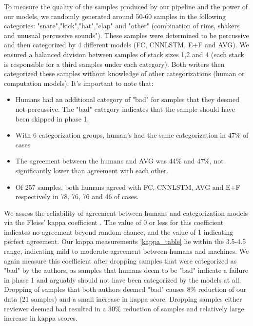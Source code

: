\documentclass{nime-alternate} %
\begin{document}
To measure the quality of the samples produced by our pipeline and the power of our models, we randomly generated around 50-60 samples in the following categories: "snare","kick","hat","clap" and "other" (combination of rims, 
shakers and unusual percussive sounds"). These samples were determined to be percussive and then categorized by 4 different models (FC, CNNLSTM, E+F and AVG). We ensured a balanced division between samples of stack sizes 1,2 and 4 (each stack is responsible for a third samples under each category). Both writers then categorized these samples without knowledge of other categorizations (human or computation models). It's important to note that:
\begin{itemize}
    \item Humans had an additional category of "bad" for samples that they deemed not percussive. The "bad" category indicates that the sample should have been skipped in phase 1. 
    \item With 6 categorization groups, human's had the same categorization in 47\% of cases
    \item The agreement between the humans and AVG was 44\% and 47\%, not significantly lower than agreement with each other. 
    \item Of 257 samples, both humans agreed with FC, CNNLSTM, AVG and E+F respectively in 78, 76, 76 and 46 of cases.
\end{itemize}
We assess the reliability of agreement between humans and categorization models via the Fleiss' kappa coefficient \cite{fleiss1971measuring}. The value of 0 or less for this coefficient indicates no agreement beyond random chance, and the value of 1 indicating perfect agreement. Our kappa measurements \ref{kappa_table} lie within the 3.5-4.5 range, indicating mild to moderate agreement between humans and machines. We again measure this coefficient after dropping samples that were categorized as "bad" by the authors, as samples that humans deem to be "bad" indicate a failure in phase 1 and arguably should not have been categorized by the models at all. Dropping of samples that both authors deemed "bad" causes 8\% reduction of our data (21 samples) and a small increase in kappa score. Dropping samples either reviewer deemed bad resulted in a 30\% reduction of samples and relatively large increase in kappa scores. \\
\end{document}
